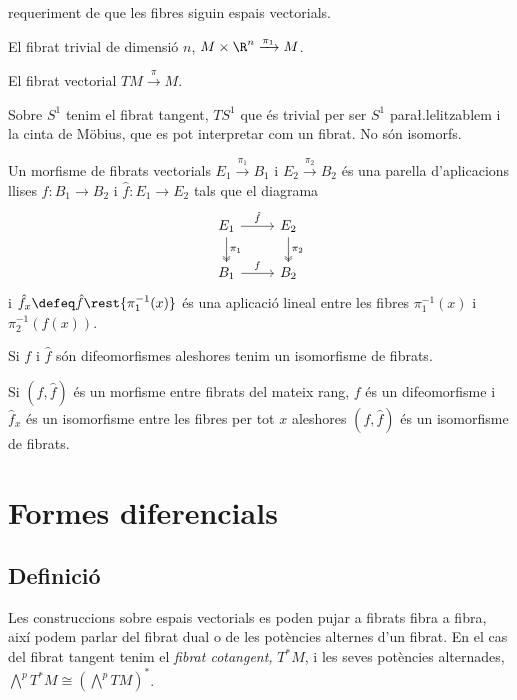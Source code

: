\documentclass[12pt,twocolumn]{article}
\begin{document}
requeriment de que les fibres siguin espais vectorials. 
\begin{example}
	\begin{points}
	\item	El fibrat trivial de dimensió \( n \), \( M \times \R^n \xrightarrow{\pi_1} M \).
	\item El fibrat vectorial \( TM \xrightarrow{\pi} M \). 
	\item Sobre \( S^1 \) tenim el fibrat tangent, \( TS^1 \) que és trivial per ser \( S^1
		\) para\l.lelitzablem i la cinta de Möbius, que es pot interpretar com un fibrat. No
		són isomorfs. 
	\end{points}
\end{example}

\begin{definition}
	Un morfisme de fibrats vectorials \( E_1 \xrightarrow{\pi_1} B_1 \) i \( E_2
	\xrightarrow{\pi_2} B_2 \) és una parella d'aplicacions llises \( f \colon B_1 \to B_2
	\) i \( \hat{f} \colon E_1 \to E_2 \) tals que el diagrama
	\begin{equation*}
		\begin{tikzcd}
			E_1 \arrow[d, two heads, "\pi_1"]\arrow[r, "\hat{f}"] & E_2 \arrow[d, two heads, "\pi_2"] \\
			B_1 \arrow[r, "f"] & B_2
		\end{tikzcd}
	\end{equation*}
	i \( \hat{f}_x \defeq \hat{f}\rest{\pi_1^{-1}(x)} \) és una aplicació lineal entre les
	fibres \( \pi_1^{-1}(x) \) i \( \pi_2^{-1}(f(x)) \). 

	Si \( f \) i \( \hat{f} \) són difeomorfismes aleshores tenim un isomorfisme de
	fibrats.
\end{definition}


\begin{theorem}
	Si \( (f,\hat{f}) \) és un morfisme entre fibrats del mateix rang, \( f \) és un
	difeomorfisme i \( \hat{f}_x \) és un isomorfisme entre les fibres per tot \( x \)
	aleshores \( (f, \hat{f}) \) és un isomorfisme de fibrats.
\end{theorem}

\section{Formes diferencials}
\subsection{Definició}
Les construccions sobre espais vectorials es poden pujar a fibrats fibra a fibra, així
podem parlar del fibrat dual o de les potències alternes d'un fibrat. En el cas del fibrat
tangent tenim el \emph{fibrat cotangent,} \( T^\ast M \), i les seves potències
alternades, \( \bigwedge^p T^\ast M \cong (\bigwedge^p TM)^\ast \). 
\end{document}
